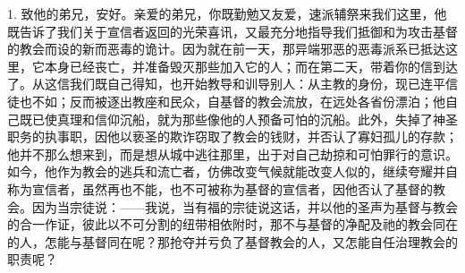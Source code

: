 \par

1. 致他的弟兄，安好。亲爱的弟兄，你既勤勉又友爱，速派辅祭来我们这里，他既告诉了我们关于宣信者返回的光荣喜讯，又最充分地指导我们抵御和为攻击基督的教会而设的新而恶毒的诡计。因为就在前一天，那异端邪恶的恶毒派系已抵达这里，它本身已经丧亡，并准备毁灭那些加入它的人；而在第二天，带着你的信到达了。从这信我们既自己得知，也开始教导和训导别人：从主教的身份，现已连平信徒也不如；反而被逐出教座和民众，自基督的教会流放，在远处各省份漂泊；他自己既已使真理和信仰沉船，就为那些像他的人预备可怕的沉船。此外，失掉了神圣职务的执事职，因他以亵圣的欺诈窃取了教会的钱财，并否认了寡妇孤儿的存款；他并不那么想来到，而是想从城中逃往那里，出于对自己劫掠和可怕罪行的意识。如今，他作为教会的逃兵和流亡者，仿佛改变气候就能改变人似的，继续夸耀并自称为宣信者，虽然再也不能，也不可被称为基督的宣信者，因他否认了基督的教会。因为当宗徒说：——我说，当有福的宗徒说这话，并以他的圣声为基督与教会的合一作证，彼此以不可分割的纽带相依附时，那不与基督的净配及祂的教会同在的人，怎能与基督同在呢？那抢夺并亏负了基督教会的人，又怎能自任治理教会的职责呢？\par

